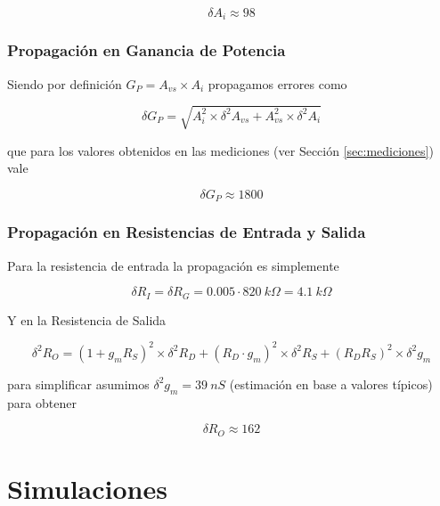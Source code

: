 \documentclass[a4paper, 10pt, spanish]{article}
\begin{document}
\begin{equation}
	\delta A_i \approx 98 \nonumber
	\end{equation}




\subsubsection{Propagación en Ganancia de Potencia}

Siendo por definición $G_P = A_{vs}\times A_{i}$ propagamos errores como

\begin{equation}
	\delta G_P = \sqrt{A_i^2 \times \delta^2 A_{vs} + A_{vs}^2\times \delta^2A_i} \nonumber
	\end{equation}

que para los valores obtenidos en las mediciones (ver Sección \ref{sec:mediciones}) vale

\begin{equation}
	\delta G_P \approx 1800 \nonumber
	\end{equation}


\subsubsection{Propagación en Resistencias de Entrada y Salida}

Para la resistencia de entrada la propagación es simplemente

\begin{equation}
	\delta R_I = \delta R_G = 0.005\cdot 820\ k\Omega = 4.1\ k\Omega \nonumber
	\end{equation}

Y en la Resistencia de Salida

\begin{equation}
	\delta^2 R_O = (1+g_mR_S)^2 \times \delta^2 R_D + (R_D\cdot g_m)^2 \times \delta^2 R_S + (R_DR_S)^2 \times \delta^2 g_m \nonumber
	\end{equation}

para simplificar asumimos $\delta^2 g_m = 39\ nS$ (estimación en base a valores típicos) para obtener

\begin{equation}
	\delta R_O \approx 162 \nonumber
\end{equation}


\newpage
\section{Simulaciones}
\end{document}

